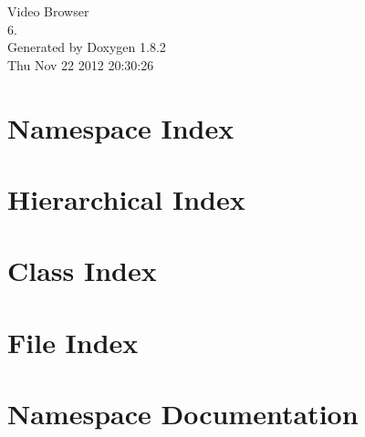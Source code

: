 \documentclass{book}
\begin{document}
\hypersetup{pageanchor=false,citecolor=blue}
\begin{titlepage}
\vspace*{7cm}
\begin{center}
{\Large Video Browser \\[1ex]\large 6. }\\
\vspace*{1cm}
{\large Generated by Doxygen 1.8.2}\\
\vspace*{0.5cm}
{\small Thu Nov 22 2012 20:30:26}\\
\end{center}
\end{titlepage}
\clearemptydoublepage
{}
\tableofcontents
\clearemptydoublepage
{}
\hypersetup{pageanchor=true,citecolor=blue}
\chapter{Namespace Index}

\chapter{Hierarchical Index}

\chapter{Class Index}

\chapter{File Index}

\chapter{Namespace Documentation}








\end{document}
